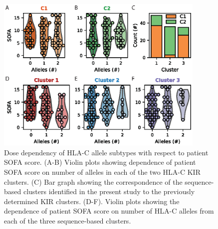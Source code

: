 \documentclass[utf8]{frontiers_suppmat} %
\begin{document}
\begin{figure}[htbp]
\begin{center}
\includegraphics[width=10cm]{FigureS3}
\end{center}
\caption{Dose dependency of HLA-C allele subtypes with respect to patient SOFA score. (A-B) Violin plots showing dependence of patient SOFA score on number of alleles in each of the two HLA-C KIR clusters. (C) Bar graph showing the correspondence of the sequence-based clusters identified in the present study to the previously determined KIR clusters. (D-F). Violin plots showing the dependence of patient SOFA score on number of HLA-C alleles from each of the three sequence-based clusters. }\label{fig:3}
\end{figure}



%
\end{document}
